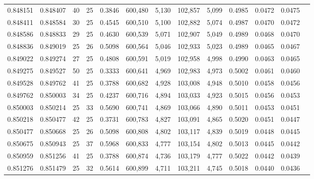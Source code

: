 \begin{tabular}{rrrrrrrrrrrrr}
0.848151 & 0.848407 &    40 &  25 &                                     0.3846 & 600,480 &   5,130 & 102,857 &   5,099 & 0.4985 & 0.0472 & 0.0475 \\
0.848411 & 0.848584 &    30 &  25 &                                     0.4545 & 600,510 &   5,100 & 102,882 &   5,074 & 0.4987 & 0.0470 & 0.0472 \\
0.848586 & 0.848833 &    29 &  25 &                                     0.4630 & 600,539 &   5,071 & 102,907 &   5,049 & 0.4989 & 0.0468 & 0.0470 \\
0.848836 & 0.849019 &    25 &  26 &                                     0.5098 & 600,564 &   5,046 & 102,933 &   5,023 & 0.4989 & 0.0465 & 0.0467 \\
0.849022 & 0.849274 &    27 &  25 &                                     0.4808 & 600,591 &   5,019 & 102,958 &   4,998 & 0.4990 & 0.0463 & 0.0465 \\
0.849275 & 0.849527 &    50 &  25 &                                     0.3333 & 600,641 &   4,969 & 102,983 &   4,973 & 0.5002 & 0.0461 & 0.0460 \\
0.849528 & 0.849762 &    41 &  25 &                                     0.3788 & 600,682 &   4,928 & 103,008 &   4,948 & 0.5010 & 0.0458 & 0.0456 \\
0.849762 & 0.850003 &    34 &  25 &                                     0.4237 & 600,716 &   4,894 & 103,033 &   4,923 & 0.5015 & 0.0456 & 0.0453 \\
0.850003 & 0.850214 &    25 &  33 &                                     0.5690 & 600,741 &   4,869 & 103,066 &   4,890 & 0.5011 & 0.0453 & 0.0451 \\
0.850218 & 0.850477 &    42 &  25 &                                     0.3731 & 600,783 &   4,827 & 103,091 &   4,865 & 0.5020 & 0.0451 & 0.0447 \\
0.850477 & 0.850668 &    25 &  26 &                                     0.5098 & 600,808 &   4,802 & 103,117 &   4,839 & 0.5019 & 0.0448 & 0.0445 \\
0.850675 & 0.850943 &    25 &  37 &                                     0.5968 & 600,833 &   4,777 & 103,154 &   4,802 & 0.5013 & 0.0445 & 0.0442 \\
0.850959 & 0.851256 &    41 &  25 &                                     0.3788 & 600,874 &   4,736 & 103,179 &   4,777 & 0.5022 & 0.0442 & 0.0439 \\
0.851276 & 0.851479 &    25 &  32 &                                     0.5614 & 600,899 &   4,711 & 103,211 &   4,745 & 0.5018 & 0.0440 & 0.0436 \\

\end{tabular}
